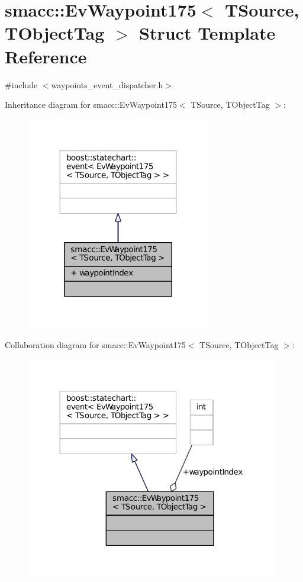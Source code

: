 \hypertarget{structsmacc_1_1EvWaypoint175}{}\section{smacc\+:\+:Ev\+Waypoint175$<$ T\+Source, T\+Object\+Tag $>$ Struct Template Reference}
\label{structsmacc_1_1EvWaypoint175}


{\ttfamily \#include $<$waypoints\+\_\+event\+\_\+dispatcher.\+h$>$}



Inheritance diagram for smacc\+:\+:Ev\+Waypoint175$<$ T\+Source, T\+Object\+Tag $>$\+:
\nopagebreak
\begin{figure}[H]
\begin{center}
\leavevmode
\includegraphics[width=227pt]{structsmacc_1_1EvWaypoint175__inherit__graph}
\end{center}
\end{figure}


Collaboration diagram for smacc\+:\+:Ev\+Waypoint175$<$ T\+Source, T\+Object\+Tag $>$\+:
\nopagebreak
\begin{figure}[H]
\begin{center}
\leavevmode
\includegraphics[width=312pt]{structsmacc_1_1EvWaypoint175__coll__graph}
\end{center}
\end{figure}

